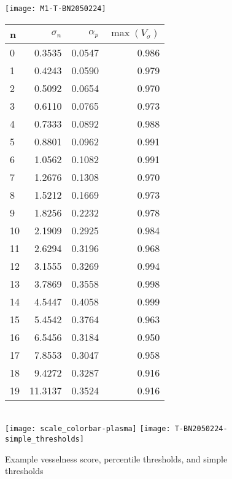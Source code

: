 %

\begin{figure}
  \begin{minipage}[tp]{0.5\textwidth}
    \texttt{[image: M1-T-BN2050224]}
  \end{minipage}
  \begin{minipage}[tp]{0.5\textwidth}
    \begin{tabular}{l|r|r|r}
      n  & $\sigma_n$  &  $\alpha_p$  &  $\max(V_\sigma)$ \\
      \hline
      0  &   0.3535 &  0.0547 &  0.986\\
      1  &   0.4243 &  0.0590 &  0.979\\
      2  &   0.5092 &  0.0654 &  0.970\\
      3  &   0.6110 &  0.0765 &  0.973\\
      4  &   0.7333 &  0.0892 &  0.988\\
      5  &   0.8801 &  0.0962 &  0.991\\
      6  &   1.0562 &  0.1082 &  0.991\\
      7  &   1.2676 &  0.1308 &  0.970\\
      8  &   1.5212 &  0.1669 &  0.973\\
      9  &   1.8256 &  0.2232 &  0.978\\
      10 &   2.1909 &  0.2925 &  0.984\\
      11 &   2.6294 &  0.3196 &  0.968\\
      12 &   3.1555 &  0.3269 &  0.994\\
      13 &   3.7869 &  0.3558 &  0.998\\
      14 &   4.5447 &  0.4058 &  0.999\\
      15 &   5.4542 &  0.3764 &  0.963\\
      16 &   6.5456 &  0.3184 &  0.950\\
      17 &   7.8553 &  0.3047 &  0.958\\
      18 &   9.4272 &  0.3287 &  0.916\\
      19 &  11.3137 &  0.3524 &  0.916\\
    \end{tabular} \\
    \texttt{[image: scale\_colorbar-plasma]} \;
    \texttt{[image: T-BN2050224-simple\_thresholds]}
  \end{minipage}
  \caption{Example vesselness score, percentile thresholds, and simple thresholds}
  \label{fig:detailed_frangi_with_table}
\end{figure}



